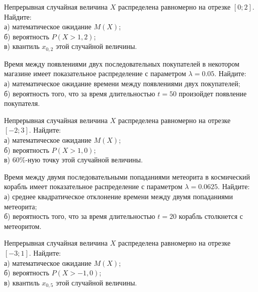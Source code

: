 \vfill

\newpage\setcounter{zad}{0}

\z Непрерывная случайная величина $X$ распределена равномерно на отрезке $[0; 2]$. Найдите: \\ \quad а) математическое ожидание $M(X)$; \\ \quad б) вероятность $P(X>1{,}2)$; \\ \quad в) квантиль $x_{0{,}2}$ этой случайной величины.


\vfill

\z Время между появлениями двух последовательных покупателей в некотором магазине имеет показательное распределение с параметром $\lambda = 0.05$. Найдите: \\ \quad а) математическое ожидание времени между появлениями двух покупателей; \\ \quad б) вероятность того, что за время длительностью $t = 50$  произойдет появление покупателя.
 

\vfill

\newpage\setcounter{zad}{0}

\z Непрерывная случайная величина $X$ распределена равномерно на отрезке $[-2; 3]$. Найдите: \\ \quad а) математическое ожидание $M(X)$; \\ \quad б) вероятность $P(X>1{,}0)$; \\ \quad в) $60\%$-ную точку этой случайной величины.


\vfill

\z Время между двумя последовательными попаданиями метеорита в космический корабль имеет показательное распределение с параметром $\lambda = 0.0625$. Найдите: \\ \quad а) среднее квадратическое отклонение времени между двумя попаданиями метеорита; \\ \quad б) вероятность того, что за время длительностью $t = 20$ корабль  столкнется с метеоритом.
 

\vfill

\newpage\setcounter{zad}{0}

\z Непрерывная случайная величина $X$ распределена равномерно на отрезке $[-3; 1]$. Найдите: \\ \quad а) математическое ожидание $M(X)$; \\ \quad б) вероятность $P(X>-1{,}0)$; \\ \quad в) квантиль $x_{0{,}5}$ этой случайной величины.


\vfill

